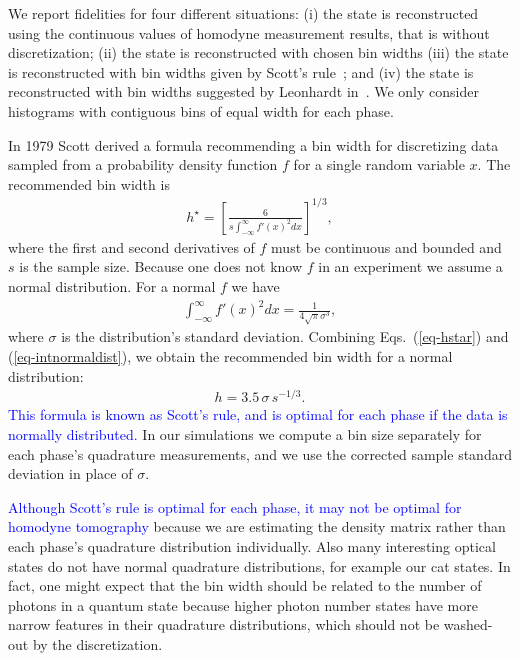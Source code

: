 \documentclass[
reprint,
superscriptaddress,
showpacs,
amsmath,
amssymb,
aps,
pra,
longbibliography
]{revtex4-1}
\providecommand{\editcolor}[2]{\textcolor{#1}{#2}}
\providecommand{\editcolor}[2]{#2}
\newcommand{\HV}[1]{\editcolor{blue}{#1}}
\begin{document}
We report fidelities for four different situations: 
(i) the state is reconstructed using the continuous values of homodyne measurement results, that is without discretization; (ii) the state is reconstructed 
with chosen bin widths (iii) the state is reconstructed with bin widths given by
Scott's rule~\cite{Scott2010}; and (iv) the state is reconstructed
with bin widths suggested by Leonhardt in~\cite{Leonhardt1997}. We  
only consider histograms with contiguous bins of equal width for each phase.

In 1979 Scott derived a formula recommending a bin width for discretizing 
data sampled from a probability density function $f$ for a single random variable
$x$. The recommended bin width is
\begin{eqnarray}
  h^{\star} = \left[ \frac{6}{s \int_{-\infty}^{\infty} f'(x)^2 dx} \right]^{1/3},
  \label{eq-hstar}
\end{eqnarray}
where the first and second derivatives of $f$ must be continuous and bounded and 
$s$ is the sample size. Because one does not know $f$ in an experiment we 
assume a normal distribution. For a normal $f$ we have
\begin{eqnarray}
  \int_{-\infty}^{\infty} f'(x)^2 dx = \frac{1}{4 \sqrt{\pi} \sigma ^3},
  \label{eq-intnormaldist}
\end{eqnarray}
where $\sigma$ is the distribution's standard deviation. 
Combining Eqs.~(\ref{eq-hstar}) and (\ref{eq-intnormaldist}), we obtain the recommended
bin width for a normal distribution:
\begin{eqnarray}
  h = 3.5 \, \sigma \, s^{-1/3}.
\end{eqnarray}
\HV{This formula is known as Scott's rule, and is optimal for each phase 
if the data is normally distributed.} In our simulations we compute a bin size
separately for each phase's quadrature measurements, and we use the
corrected sample standard deviation in place of $\sigma$.

\HV{Although Scott's rule is optimal for each phase, it may not be optimal
for homodyne tomography} because we are estimating the density matrix
rather than each phase's quadrature distribution individually.  Also
many interesting optical states do not have normal quadrature
distributions, for example our cat states.  In fact, one might
expect that the bin width should be related to the number of photons
in a quantum state because higher photon number states have more
narrow features in their quadrature distributions, which should not
be washed-out by the discretization. 
  
\end{document}
